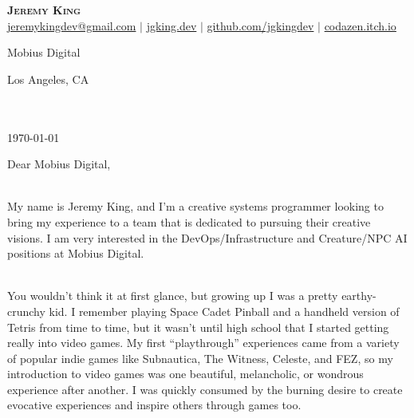 \documentclass[letterpaper,11pt]{article}
\newcommand{\companyname}[1]{
\raggedright#1\\
}
\newcommand{\companyaddress}[1]{
\raggedright#1\\
\mbox{}\\
\mbox{}\\
}
\newcommand{\currentdate}[1]{
\raggedleft#1\\
}
\newcommand{\lettercontent}[1]{
\raggedright#1\\
\mbox{}\\
}
\begin{document}

\begin{center}
	\textbf{\Huge \scshape Jeremy King} \\ \vspace{4pt}
	\href{mailto:jeremykingdev@gmail.com}{jeremykingdev@gmail.com} $|$ 
	\href{https://jgking.dev}{jgking.dev} $|$
	\href{https://github.com/jgkingdev}{github.com/jgkingdev} $|$
	\href{https://codazen.itch.io}{codazen.itch.io}
\end{center}


\hfill

\begin{minipage}[t]{0.5\textwidth} 
\companyname{Mobius Digital}
\companyaddress{Los Angeles, CA}
\end{minipage}
\begin{minipage}[t]{0.49\textwidth}
\currentdate{\today}
\end{minipage}

\vspace{1.5cm}


\lettercontent{Dear Mobius Digital,}

\lettercontent{
My name is Jeremy King, and I'm a creative systems programmer looking to bring my experience to a team that is dedicated to pursuing their creative visions. I am very interested in the DevOps/Infrastructure and Creature/NPC AI positions at Mobius Digital.
}

\lettercontent{
You wouldn't think it at first glance, but growing up I was a pretty earthy-crunchy kid. I remember playing Space Cadet Pinball and a handheld version of Tetris from time to time, but it wasn't until high school that I started getting really into video games. My first ``playthrough'' experiences came from a variety of popular indie games like Subnautica, The Witness, Celeste, and FEZ, so my introduction to video games was one beautiful, melancholic, or wondrous experience after another. I was quickly consumed by the burning desire to create evocative experiences and inspire others through games too.
}
\end{document}
